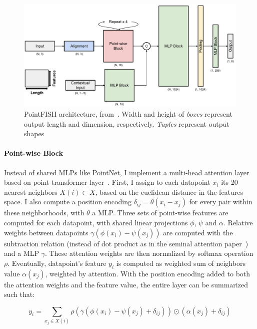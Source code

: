 \begin{figure}[]
    \centering
    \includegraphics[width=1\textwidth]{figures/chapter4/PointFISH_architecture}
    \caption[PointFISH model]{PointFISH architecture, from~\cite{pointfish_2022}.
	Width and height of \textit{boxes} represent output length and dimension, respectively.
	\textit{Tuples} represent output shapes}
    \label{fig:PointFISH_architecture}
\end{figure}

\paragraph{Point-wise Block}

Instead of shared MLPs like PointNet, I implement a multi-head attention layer based on point transformer layer~\cite{Zhao_2021_ICCV}.
First, I assign to each datapoint $x_i$ its 20 nearest neighbors $X(i) \subset X$, based on the euclidean distance in the features space.
I also compute a position encoding $\delta_{ij} = \theta(x_i - x_j)$ for every pair within these neighborhoods, with $\theta$ a MLP.
Three sets of point-wise features are computed for each datapoint, with shared linear projections $\phi$, $\psi$ and $\alpha$.
Relative weights between datapoints $\gamma(\phi(x_i) - \psi(x_j))$ are computed with the subtraction relation (instead of dot product as in the seminal attention paper~\cite{NIPS2017_3f5ee243}) and a MLP $\gamma$.
These attention weights are then normalized by softmax operation $\rho$.
Eventually, datapoint's feature $y_i$ is computed as weighted sum of neighbors value $\alpha(x_j)$, weighted by attention.
With the position encoding added to both the attention weights and the feature value, the entire layer can be summarized such that:

\begin{equation}
	{\displaystyle y_i = \sum_{x_j \in X(i)} \rho(\gamma(\phi(x_i) - \psi(x_j) + \delta_{ij})) \odot (\alpha(x_j) + \delta_{ij})}
\end{equation}

